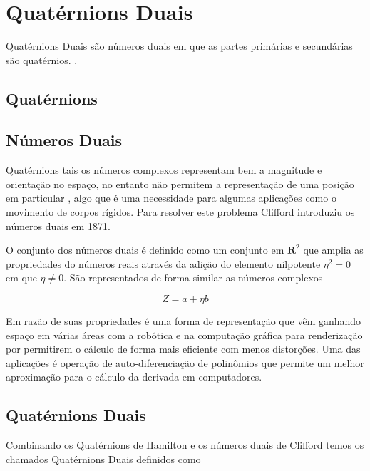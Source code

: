 \section{Quatérnions Duais}

Quatérnions Duais são números duais em que as partes primárias e secundárias são quatérnios.  \cite{nobody}.

\subsection{Quatérnions}

\subsection{Números Duais}

Quatérnions tais os números complexos representam bem a magnitude e orientação no espaço, no entanto não permitem a representação de uma posição em particular \cite{Clifford1871DQ}, algo que é uma necessidade para algumas aplicações como o movimento de corpos rígidos. Para resolver este problema Clifford introduziu os números duais em 1871.

O conjunto dos números duais é definido como um conjunto em $\mathbf{R}^2$ que amplia as propriedades do números reais através da adição do elemento nilpotente $\eta^2 = 0$ em que $\eta \neq 0$. São representados de forma similar as números complexos

\begin{equation}
    Z = a + \eta b
\end{equation}


Em razão de suas propriedades é uma forma de representação que vêm ganhando espaço em várias áreas com a robótica \cite{Adorno2011} e na computação gráfica para renderização \cite{nobody} por permitirem o cálculo de forma mais eficiente com menos distorções. Uma das aplicações é operação de auto-diferenciação de polinômios que permite um melhor aproximação para o cálculo da derivada em computadores.

\subsection{Quatérnions Duais}

Combinando os Quatérnions de Hamilton e os números duais de Clifford temos os chamados Quatérnions Duais definidos como

